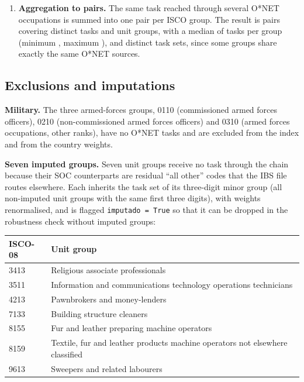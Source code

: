 \begin{enumerate}
  \item \textbf{Aggregation to pairs.} The same task reached through several O*NET occupations is summed into one pair per ISCO group. The result is  pairs covering  distinct tasks and  unit groups, with a median of  tasks per group (minimum , maximum ), and  distinct task sets, since some groups share exactly the same O*NET sources.
\end{enumerate}

\subsection{Exclusions and imputations}

\textbf{Military.} The three armed-forces groups, 0110 (commissioned armed forces officers), 0210 (non-commissioned armed forces officers) and 0310 (armed forces occupations, other ranks), have no O*NET tasks and are excluded from the index and from the country weights.

\textbf{Seven imputed groups.} Seven unit groups receive no task through the chain because their SOC counterparts are residual ``all other'' codes that the IBS file routes elsewhere. Each inherits the task set of its three-digit minor group (all non-imputed unit groups with the same first three digits), with weights renormalised, and is flagged \texttt{imputado = True} so that it can be dropped in the robustness check without imputed groups:

\begin{center}
  \small
  \begin{tabular}{@{}ll@{}}
    \toprule
    ISCO-08 & Unit group \\
    \midrule
    3413 & Religious associate professionals \\
    3511 & Information and communications technology operations technicians \\
    4213 & Pawnbrokers and money-lenders \\
    7133 & Building structure cleaners \\
    8155 & Fur and leather preparing machine operators \\
    8159 & Textile, fur and leather products machine operators not elsewhere classified \\
    9613 & Sweepers and related labourers \\
    \bottomrule
  \end{tabular}
\end{center}

